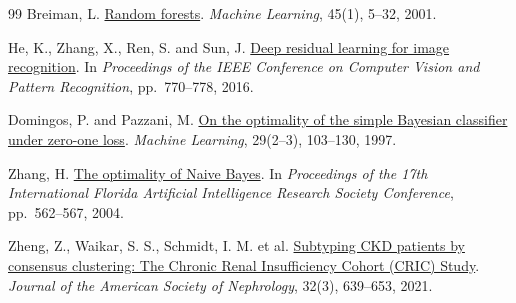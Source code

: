 \begin{thebibliography}{99}
Breiman, L.
\href{https://doi.org/10.1023/A:1010933404324}{Random forests}.
\textit{Machine Learning}, 45(1), 5--32, 2001.

He, K., Zhang, X., Ren, S. and Sun, J.
\href{https://doi.org/10.1109/CVPR.2016.90}{Deep residual learning for image recognition}.
In \textit{Proceedings of the IEEE Conference on Computer Vision and Pattern Recognition}, pp.~770--778, 2016.

Domingos, P. and Pazzani, M.
\href{https://doi.org/10.1023/A:1007413511361}{On the optimality of the simple Bayesian classifier under zero-one loss}.
\textit{Machine Learning}, 29(2--3), 103--130, 1997.

Zhang, H.
\href{https://cdn.aaai.org/FLAIRS/2004/Flairs04-097.pdf}{The optimality of Naive Bayes}.
In \textit{Proceedings of the 17th International Florida Artificial Intelligence Research Society Conference}, pp.~562--567, 2004.

Zheng, Z., Waikar, S. S., Schmidt, I. M. et al.
\href{https://doi.org/10.1681/ASN.2020030239}{Subtyping CKD patients by consensus clustering: The Chronic Renal Insufficiency Cohort (CRIC) Study}.
\textit{Journal of the American Society of Nephrology}, 32(3), 639--653, 2021.


\end{thebibliography}
\endgroup
